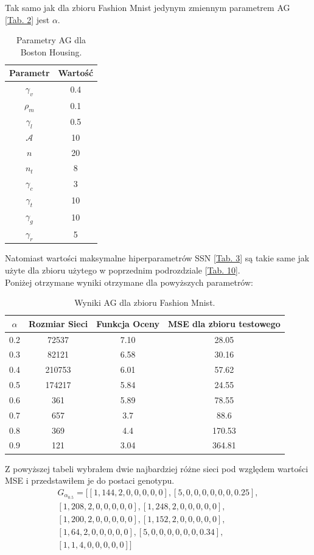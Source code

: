 \documentclass{article}
\begin{document}
Tak samo jak dla zbioru Fashion Mnist jedynym zmiennym parametrem AG 
[\hyperref[tab:params]{Tab. 2}] jest $\alpha$.
\begin{table}[H]
\centering
\begin{tabular}{|c|c|}
	\hline
	Parametr & Wartość\\
	\hline
	 $\gamma_v$ &0.4\\
	 $\rho_m$ &0.1\\
	 $\gamma_l$& 0.5\\
	 $\mathcal{A}$ &10\\
	 $n$  &20\\
	 $n_t$  &8\\
	 $\gamma_c$  &3\\
	 $\gamma_t$ &10\\
	 $\gamma_g$ &10\\
	 $\gamma_r$ &5\\
	\hline
\end{tabular}
\caption{\label{tab:bh_params}Parametry AG dla Boston Housing.}
\end{table}
Natomiast wartości maksymalne hiperparametrów SSN [\hyperref[tab:zakres]{Tab. 3}] są takie
same jak użyte dla zbioru użytego w poprzednim podrozdziale 
[\hyperref[tab:fm_zakres]{Tab. 10}].\\
Poniżej otrzymane wyniki otrzymane dla powyższych parametrów:
\begin{table}[H]
\centering
\begin{tabular}{|c|c|c|c|}
        \hline
	$\alpha$ & Rozmiar Sieci & Funkcja Oceny & MSE dla zbioru testowego\\
	\hline
	0.2 & 72537 & 7.10 &  28.05 \\
	0.3 & 82121 & 6.58 & 30.16\\
	0.4 & 210753 & 6.01 & 57.62\\
	0.5 & 174217 & 5.84 &  24.55\\
	0.6 & 361 & 5.89 & 78.55 \\
	0.7 & 657 & 3.7 & 88.6 \\
	0.8 & 369 &  4.4 & 170.53\\
	0.9 & 121 & 3.04 & 364.81\\
	\hline
\end{tabular}
\caption{\label{tab:fmres}Wyniki AG dla zbioru Fashion Mnist.}
\end{table}
 Z powyższej tabeli wybrałem dwie najbardziej różne sieci pod względem wartości MSE i 
 przedstawiłem je do postaci genotypu.\\
\begin{align*}
	G_{\alpha_{0.5}} = \big[[1, 144, 2, 0, 0, 0, 0, 0], [5, 0, 0, 0, 0, 0, 0, 0.25],\\
	                        [1, 208, 2, 0, 0, 0, 0, 0], [1, 248, 2, 0, 0, 0, 0, 0],\\
				[1, 200, 2, 0, 0, 0, 0, 0], [1, 152, 2, 0, 0, 0, 0, 0],\\
				[1, 64, 2, 0, 0, 0, 0, 0], [5, 0, 0, 0, 0, 0, 0, 0.34],\\
				[1, 1, 4, 0, 0, 0, 0, 0]\big]
\end{align*}
\end{document}
